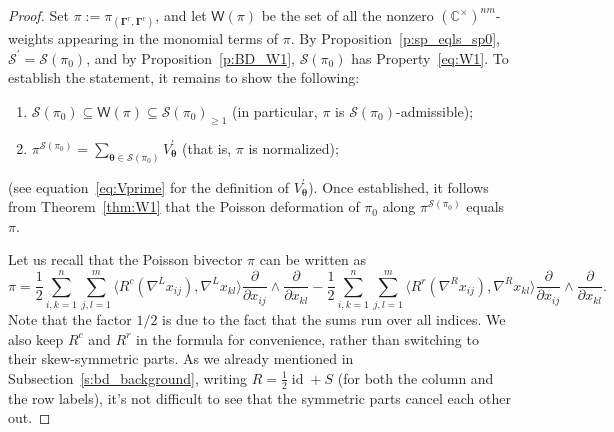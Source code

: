 \documentclass[11pt]{article}
\newcommand{\btheta}{{\boldsymbol{\theta}}}
\newcommand{\bg}{\mathbf{\Gamma}}
\DeclareMathOperator{\id}{id}
\theoremstyle{definition}\newtheorem{definition}[theorem]{Definition}
\theoremstyle{definition}\newtheorem{remark}[theorem]{Remark}
\theoremstyle{remark}
\numberwithin{equation}{section}
\begin{document}
\begin{proof}
    Set $\pi := \pi_{(\bg^r,\bg^c)}$, and let $\mathsf{W}(\pi)$ be the set of all the nonzero $(\mathbb{C}^{\times})^{nm}$-weights appearing in the monomial terms of $\pi$. By Proposition~\ref{p:sp_eqls_sp0}, $\mathcal{S}^\prime = \mathcal{S}(\pi_0)$, and by Proposition~\ref{p:BD_W1}, $\mathcal{S}(\pi_0)$ has Property~\eqref{eq:W1}. To establish the statement, it remains to show the following:
    \begin{enumerate}[1)]
        \item $\mathcal{S}(\pi_0)\subseteq \mathsf{W}(\pi) \subseteq \mathcal{S}(\pi_0)_{\geq 1}$ (in particular, $\pi$ is $\mathcal{S}(\pi_0)$-admissible);
        \item $\pi^{\mathcal{S}(\pi_0)} = \sum_{\btheta \in \mathcal{S}(\pi_0)}V_{\btheta}^\prime$ (that is, $\pi$ is normalized);
    \end{enumerate}
    (see equation~\eqref{eq:Vprime} for the definition of $V_{\btheta}^\prime$). Once established, it follows from Theorem~\ref{thm:W1} that the Poisson deformation of $\pi_0$ along $\pi^{\mathcal{S}(\pi_0)}$ equals $\pi$. 
   
    Let us recall that the Poisson bivector $\pi$ can be written as
    \begin{equation}\label{eq:piw}
        \pi = \frac{1}{2}\sum_{i,k=1}^n \sum_{j,l=1}^m  \langle R^c(\nabla^L x_{ij}),\nabla^L x_{kl} \rangle \frac{\partial}{\partial x_{ij}}\wedge \frac{\partial}{\partial x_{kl}} - \frac{1}{2}\sum_{i,k=1}^n \sum_{j,l=1}^m  \langle R^r(\nabla^R x_{ij}),\nabla^R x_{kl} \rangle \frac{\partial}{\partial x_{ij}}\wedge \frac{\partial}{\partial x_{kl}}.
    \end{equation}
    Note that the factor $1/2$ is due to the fact that the sums run over all indices. We also keep $R^c$ and $R^r$ in the formula for convenience, rather than switching to their skew-symmetric parts. As we already mentioned in Subsection~\ref{s:bd_background}, writing $R = \frac{1}{2}\id + S$ (for both the column and the row labels), it's not difficult to see that the symmetric parts cancel each other out.
    

\end{proof}
\end{document}
